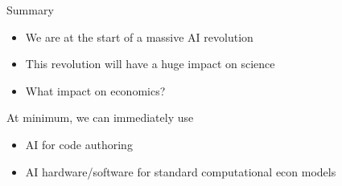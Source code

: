 \begin{frame}{Summary}

    \begin{itemize}
        \item We are at the start of a massive AI revolution
        \medskip
        \item This revolution will have a huge impact on science
        \medskip
        \item What impact on economics?
    \end{itemize}

        \medskip
        \medskip

    At minimum, we can immediately use
    \begin{itemize}
        \item AI for code authoring
        \medskip
        \item AI hardware/software for standard computational econ models
    \end{itemize}


\end{frame}





